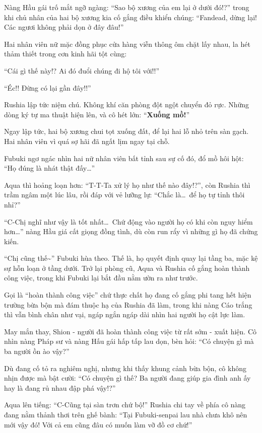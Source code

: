 \documentclass[../main.tex]{subfiles}
\begin{document}
Nàng Hầu gái trố mắt ngỡ ngàng: ``Sao bộ xương của em lại ở dưới đó!?'' trong khi chủ nhân của hai bộ xương kia cố gắng điều khiển chúng: ``Fandead, dừng lại! Các ngươi không phải dọn ở đây đâu!''

Hai nhân viên nữ mặc đồng phục cửa hàng viễn thông ôm chặt lấy nhau, la hét thảm thiết trong cơn kinh hãi tột cùng:

{\color{red}``Cái gì thế này!? Ai đó đuổi chúng đi hộ tôi với!!}''

{\color{red}``Éc!! Đừng có lại gần đây!!}''

Rushia lập tức niệm chú. Không khí căn phòng đột ngột chuyển đỏ rực. Những dòng ký tự ma thuật hiện lên, và cô hét lớn: ``\textbf{Xuống mồ!}''

Ngay lập tức, hai bộ xương chui tọt xuống đất, để lại hai lỗ nhỏ trên sàn gạch. Hai nhân viên vì quá sợ hãi đã ngất lịm ngay tại chỗ.

Fubuki ngơ ngác nhìn hai nữ nhân viên bất tỉnh sau sự cố đó, đổ mồ hôi hột: ``Họ đúng là nhát thật đấy\dots''

Aqua thì hoảng loạn hơn: ``T-T-Ta xử lý họ như thế nào đây!?'', còn Rushia thì trầm ngâm một lúc lâu, rồi đáp với vẻ lưỡng lự: ``Chắc là\dots\ để họ tự tỉnh thôi nhỉ?''

``C-Chị nghĩ như vậy là tốt nhất\dots\ Chứ động vào người họ có khi còn nguy hiểm hơn\dots'' nàng Hầu giá cất giọng đồng tình, dù còn run rẩy vì những gì họ đã chứng kiến.

``Chị cũng thế\~{}'' Fubuki hùa theo. Thế là, họ quyết định quay lại tầng ba, mặc kệ sự hỗn loạn ở tầng dưới. Trở lại phòng cũ, Aqua và Rushia cố gắng hoàn thành công việc, trong khi Fubuki lại bắt đầu nằm ườn ra như trước.

Gọi là ``hoàn thành công việc'' chứ thực chất họ đang cố gắng phi tang hết hiện trường bừa bộn mà đám thuộc hạ của Rushia đã làm, trong khi nàng Cáo trắng thì vẫn bình chân như vại, ngáp ngắn ngáp dài nhìn hai người họ cật lực làm.

May mắn thay, Shion - người đã hoàn thành công việc từ rất sớm - xuất hiện. Cô nhìn nàng Pháp sư và nàng Hấu gái hấp tấp lau dọn, bèn hỏi: ``Có chuyện gì mà ba người ồn ào vậy?''

Dù đang cố tỏ ra nghiêm nghị, nhưng khi thấy khung cảnh bừa bộn, cô không nhịn được mà bật cười: ``Có chuyện gì thế? Ba người đang giúp gia đình anh ấy hay là đang rủ nhau đập phá vậy!?''

Aqua lên tiếng: ``C-Cũng tại sàn trơn chứ bộ!'' Rushia chi tay về phía cô nàng đang nằm thảnh thơi trên ghế bành: ``Tại Fubuki-senpai lau nhà chưa khô nên mới vậy đó! Với cả em cũng đâu có muốn làm vỡ đồ cơ chứ!''
\end{document}

